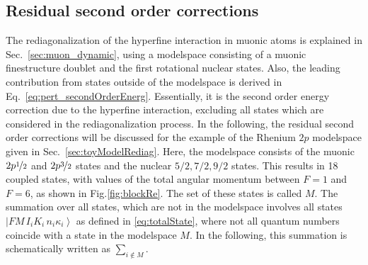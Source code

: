 \subsection{Residual second order corrections}
\label{sec:muon_residualSO}
The rediagonalization of the hyperfine interaction in muonic atoms is explained in Sec.~\ref{sec:muon_dynamic}, using a modelspace consisting of a muonic finestructure doublet and the first rotational nuclear states. Also, the leading contribution from states outside of the modelspace is derived in Eq.~\eqref{eq:pert_secondOrderEnerg}. Essentially, it is the second order energy correction due to the hyperfine interaction, excluding all states which are considered in the rediagonalization process. In the following, the residual second order corrections will be discussed for the example of the Rhenium $2p$ modelspace given in Sec.~\ref{sec:toyModelRediag}. Here, the modelspace consists of the muonic $2p\nicefrac{1}{2}$ and $2p\nicefrac{3}{2}$ states and the nuclear $5/2,7/2,9/2$ states. This results in 18 coupled states, with values of the total angular momentum between $F=1$ and $F=6$, as shown in Fig.\ref{fig:blockRe}. The set of these states is called $M$. The summation over all states, which are not in the modelspace involves all states $\left|FM\,I_iK_i\,n_i\kappa_i\right>$ as defined in \eqref{eq:totalState}, where not all quantum numbers coincide with a state in the modelspace $M$. In the following, this summation is schematically written as $\sum_{i\notin M}$.

